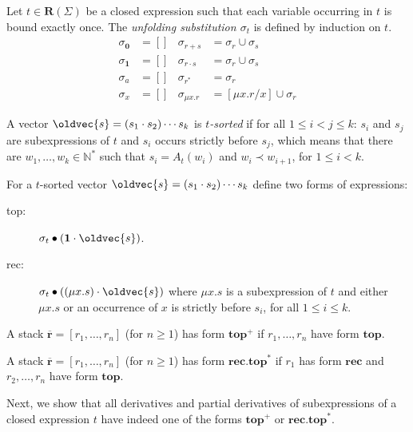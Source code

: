 \documentclass[runningheads, envcountsame, a4paper]{llncs}
\let\vec\oldvec
\newcommand\nat{\mathbb{N}}
\newcommand\Rnull{\mathbf0}
\newcommand\Rempty{\mathbf1}
\newcommand\Reg{\mathbf{R}}
\newcommand\ADDRESS{A}
\newcommand\RS{\ensuremath{\overline{\mathbf{r}}}}
\newcommand\ApplySubst[2]{#1 \bullet #2} %
\newcommand\OccursStrictlyBefore\prec
\begin{document}
\begin{definition}
  Let $t \in \Reg (\Sigma)$ be a closed expression such that each
  variable occurring in $t$ is bound exactly once. The
  \emph{unfolding substitution $\sigma_t$} is defined by induction on $t$.
  \begin{align*}
    \sigma_\Rnull  & = [] & \sigma_{r+s} & = \sigma_r \cup \sigma_s \\
    \sigma_\Rempty & = [] & \sigma_{r\cdot s} & = \sigma_r \cup \sigma_s\\
    \sigma_a       & = [] & \sigma_{r^*} &= \sigma_r \\
    \sigma_x       & = [] & \sigma_{\mu x.r} &= [\mu x.r / x] \cup \sigma_r
  \end{align*}
\end{definition}
\begin{definition}\label{def:t-sorted-vector}
  A vector $\vec{s} = (s_1\cdot s_2)\cdots s_k$ is \emph{$t$-sorted} if for all
  $1\le i < j \le k$:
    $s_i$ and $s_j$ are subexpressions of $t$ and
    $s_i$ occurs strictly before $s_j$, which means that there are
    $w_1, \dots, w_k \in \nat^*$
    such that $s_i  = {\ADDRESS_t (w_i)}$ and $w_i
    \OccursStrictlyBefore w_{i+1}$, for $1\le i < k$.

    For a $t$-sorted vector $\vec{s} = (s_1\cdot s_2)\cdots s_k$ define two forms of expressions:
    \begin{description}
    \item[top:] $\ApplySubst{\sigma_t}{(\Rempty \cdot \vec{s})}$.
    \item[rec:] $\ApplySubst{\sigma_t}{(( {\mu x.s})\cdot \vec{s})}$
      where $\mu x.s$ is a subexpression of $t$ and either $\mu x.s$ or an occurrence of $x$ is strictly
      before $s_i$, for all $1\le i \le k$.
    \end{description}
    A stack $\RS = [r_1, \dots, r_n]$ (for $n\ge1$) has form
    $\mathbf{top}^+$ if $r_1, \dots, r_n$ have form $\mathbf{top}$.

    A stack $\RS = [r_1, \dots, r_n]$ (for $n\ge1$) has form $\mathbf{rec}.\mathbf{top}^*$ if $r_1$
    has form $\mathbf{rec}$ and $r_2, \dots, r_n$ have form $\mathbf{top}$.
\end{definition}

Next, we show that all derivatives and partial derivatives of
subexpressions of a closed expression $t$ have indeed one of the forms
$\mathbf{top}^+$ or $\mathbf{rec}.\mathbf{top}^*$. 
\end{document}
